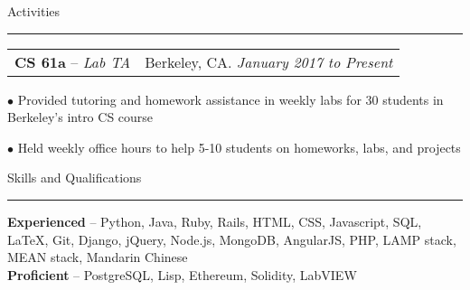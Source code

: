 \documentclass[11pt,letterpaper]{article}
\makeatletter
\newcommand{\bulletpoint}{\rule{0cm}{2pt}$\bullet$  }
\newenvironment{topic}[1]
    {
    \tabto{225pt}
    \large #1
    \vspace*{0.03in}
    \hrule 
    \vspace*{0.05in}
    }
    {
    }
\newenvironment{event}
    {
    \begin{tabular*}{\textwidth}{l@{\extracolsep{\fill}}r}
    }
    {
    \end{tabular*}
    }
\newenvironment{detail}
    {
    \normalsize
    }
    {
    \vspace*{0.02in}
    }
\makeatother
\begin{document}
    \begin{topic}{Activities}
        \begin{event}
            \textbf{CS 61a} -- \emph{Lab TA} & Berkeley, CA. \emph{January 2017 to Present}
        \end{event}
            \begin{detail}
                \bulletpoint Provided tutoring and homework assistance in weekly labs for 30 students in Berkeley's intro CS course\\
                \bulletpoint Held weekly office hours to help 5-10 students on homeworks, labs, and projects
            \end{detail} 
    \end{topic} \vspace*{0.1in}





    \begin{topic}{Skills and Qualifications}
        \begin{detail}
            \textbf{Experienced} -- Python, Java, Ruby, Rails, HTML, CSS, Javascript, SQL, LaTeX, Git, Django, jQuery, Node.js, MongoDB, AngularJS, PHP, LAMP stack, MEAN stack, Mandarin Chinese\\
            \textbf{Proficient} -- PostgreSQL, Lisp, Ethereum, Solidity, LabVIEW
        \end{detail}
    \end{topic}

\end{document}
